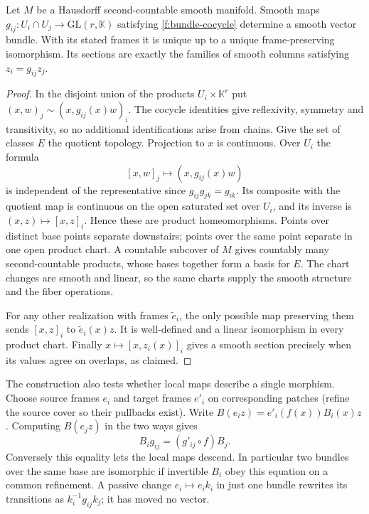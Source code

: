 \begin{theorem}\label{f:bundle-gluing}
Let $M$ be a Hausdorff second-countable smooth manifold. Smooth maps $g_{ij}:U_i\cap U_j\to\mathrm{GL}(r,\mathbb K)$ satisfying \eqref{f:bundle-cocycle} determine a smooth vector bundle. With its stated frames it is unique up to a unique frame-preserving isomorphism. Its sections are exactly the families of smooth columns satisfying $z_i=g_{ij}z_j$.
\end{theorem}
\begin{proof}
In the disjoint union of the products $U_i\times\mathbb K^r$ put $(x,w)_j\sim(x,g_{ij}(x)w)_i$. The cocycle identities give reflexivity, symmetry and transitivity, so no additional identifications arise from chains. Give the set of classes $E$ the quotient topology. Projection to $x$ is continuous. Over $U_i$ the formula
\[
 [x,w]_j\longmapsto (x,g_{ij}(x)w)
\]
is independent of the representative since $g_{ij}g_{jk}=g_{ik}$. Its composite with the quotient map is continuous on the open saturated set over $U_i$, and its inverse is $(x,z)\mapsto[x,z]_i$. Hence these are product homeomorphisms. Points over distinct base points separate downstairs; points over the same point separate in one open product chart. A countable subcover of $M$ gives countably many second-countable products, whose bases together form a basis for $E$. The chart changes are smooth and linear, so the same charts supply the smooth structure and the fiber operations.

For any other realization with frames $\widetilde e_i$, the only possible map preserving them sends $[x,z]_i$ to $\widetilde e_i(x)z$. It is well-defined and a linear isomorphism in every product chart. Finally $x\mapsto[x,z_i(x)]_i$ gives a smooth section precisely when its values agree on overlaps, as claimed.
\end{proof}

The construction also tests whether local maps describe a single morphism. Choose source frames $e_i$ and target frames $e'_i$ on corresponding patches (refine the source cover so their pullbacks exist). Write $B(e_i z)=e'_i(f(x))B_i(x)z$. Computing $B(e_j z)$ in the two ways gives
\begin{equation}
 B_i g_{ij}=(g'_{ij}\circ f)B_j .\label{f:morphism-overlap}
\end{equation}
Conversely this equality lets the local maps descend. In particular two bundles over the same base are isomorphic if invertible $B_i$ obey this equation on a common refinement. A passive change $e_i\mapsto e_i k_i$ in just one bundle rewrites its transitions as $k_i^{-1}g_{ij}k_j$; it has moved no vector.

